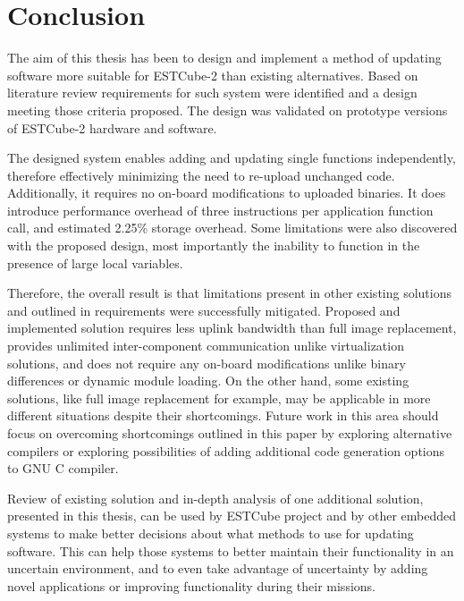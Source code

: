 \clearpage
\section{Conclusion}
\label{s:conclusion}

The aim of this thesis has been to design and implement a method of updating software more suitable for ESTCube-2 than existing alternatives. Based on literature review requirements for such system were identified and a design meeting those criteria proposed. The design was validated on prototype versions of ESTCube-2 hardware and software.

The designed system enables adding and updating single functions independently, therefore effectively minimizing the need to re-upload unchanged code. Additionally, it requires no on-board modifications to uploaded binaries. It does introduce performance overhead of three instructions per application function call, and estimated 2.25\% storage overhead. Some limitations were also discovered with the proposed design, most importantly the inability to function in the presence of large local variables.

Therefore, the overall result is that limitations present in other existing solutions and outlined in requirements were successfully mitigated. Proposed and implemented solution requires less uplink bandwidth than full image replacement, provides unlimited inter-component communication unlike virtualization solutions, and does not require any on-board modifications unlike binary differences or dynamic module loading. On the other hand, some existing solutions, like full image replacement for example, may be applicable in more different situations despite their shortcomings. Future work in this area should focus on overcoming shortcomings outlined in this paper by exploring alternative compilers or exploring possibilities of adding additional code generation options to GNU C compiler.

Review of existing solution and in-depth analysis of one additional solution, presented in this thesis, can be used by ESTCube project and by other embedded systems to make better decisions about what methods to use for updating software. This can help those systems to better maintain their functionality in an uncertain environment, and to even take advantage of uncertainty by adding novel applications or improving functionality during their missions.
